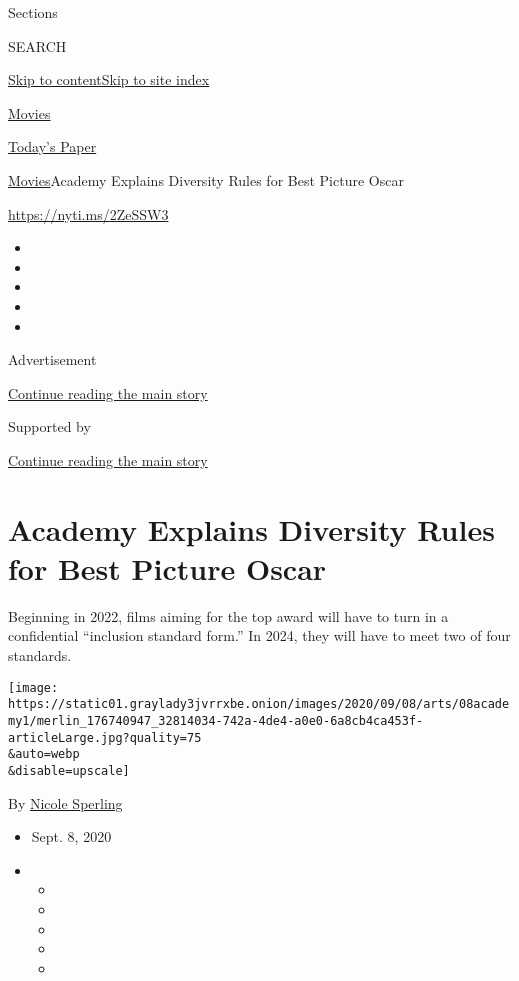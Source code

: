 Sections

SEARCH

\protect\hyperlink{site-content}{Skip to
content}\protect\hyperlink{site-index}{Skip to site index}

\href{https://www.nytimes3xbfgragh.onion/section/movies}{Movies}

\href{https://myaccount.nytimes3xbfgragh.onion/auth/login?response_type=cookie\&client_id=vi}{}

\href{https://www.nytimes3xbfgragh.onion/section/todayspaper}{Today's
Paper}

\href{/section/movies}{Movies}\textbar{}Academy Explains Diversity Rules
for Best Picture Oscar

\url{https://nyti.ms/2ZeSSW3}

\begin{itemize}
\item
\item
\item
\item
\item
\end{itemize}

Advertisement

\protect\hyperlink{after-top}{Continue reading the main story}

Supported by

\protect\hyperlink{after-sponsor}{Continue reading the main story}

\hypertarget{academy-explains-diversity-rules-for-best-picture-oscar}{%
\section{Academy Explains Diversity Rules for Best Picture
Oscar}\label{academy-explains-diversity-rules-for-best-picture-oscar}}

Beginning in 2022, films aiming for the top award will have to turn in a
confidential ``inclusion standard form.'' In 2024, they will have to
meet two of four standards.

\texttt{[image: https://static01.graylady3jvrrxbe.onion/images/2020/09/08/arts/08academy1/merlin\_176740947\_32814034-742a-4de4-a0e0-6a8cb4ca453f-articleLarge.jpg?quality=75\\\&auto=webp\\\&disable=upscale]}

By \href{https://www.nytimes3xbfgragh.onion/by/nicole-sperling}{Nicole
Sperling}

\begin{itemize}
\item
  Sept. 8, 2020
\item
  \begin{itemize}
  \item
  \item
  \item
  \item
  \item
  \end{itemize}
\end{itemize}

